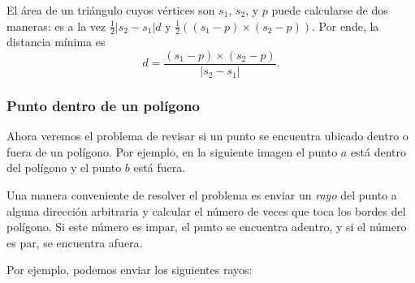 El área de un triángulo cuyos vértices son $s_1$, $s_2$, y $p$ puede
calcularse de dos maneras: es a la vez $\frac{1}{2} |s_2-s_1| d$ y
$\frac{1}{2} ((s_1-p) \times (s_2-p))$. Por ende, la distancia mínima es
\[ d = \frac{(s_1-p) \times (s_2-p)}{|s_2-s_1|} .\]

\subsubsection{Punto dentro de un polígono}

Ahora veremos el problema de revisar si un punto se encuentra ubicado dentro
o fuera de un polígono. Por ejemplo, en la siguiente imagen el punto $a$ está
dentro del polígono y el punto $b$ está fuera.

\begin{center}
\end{center}

Una manera conveniente de resolver el problema es enviar un \emph{rayo} del
punto a alguna dirección arbitraria y calcular el número de veces que toca
los bordes del polígono. Si este número es impar, el punto se encuentra
adentro, y si el número es par, se encuentra afuera.

\begin{samepage}
    Por ejemplo, podemos enviar los siguientes rayos:
    \begin{center}
    \end{center}
\end{samepage}

